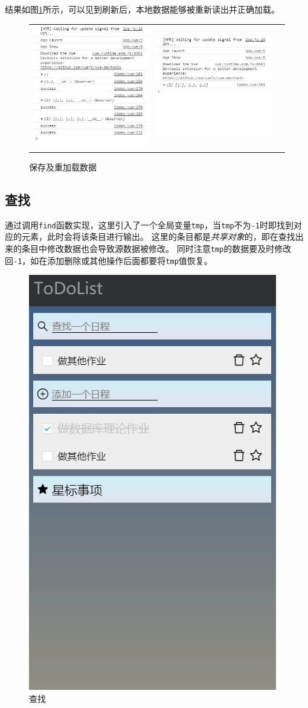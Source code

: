 \documentclass[logo,reportComp]{thesis}
\begin{document}
结果如图\ref{fig:save}所示，可以见到刷新后，本地数据能够被重新读出并正确加载。
\begin{figure}[H]
\centering
\begin{tabular}{ccc}
\includegraphics[width=0.4\linewidth]{fig/before.png}&
\includegraphics[width=0.4\linewidth]{fig/after.png}
\end{tabular}
\caption{保存及重加载数据}
\label{fig:save}
\end{figure}

\subsection{查找}
通过调用\verb'find'函数实现，这里引入了一个全局变量\verb'tmp'，当\verb'tmp'不为\verb'-1'时即找到对应的元素，此时会将该条目进行输出。
这里的条目都是\emph{共享对象}的，即在查找出来的条目中修改数据也会导致源数据被修改。
同时注意\verb'tmp'的数据要及时修改回\verb'-1'，如在添加删除或其他操作后面都要将\verb'tmp'值恢复。
\begin{figure}[H]
\centering
\includegraphics[width=0.4\linewidth]{fig/search.png}
\caption{查找}
\label{fig:search}
\end{figure}
\end{document}
